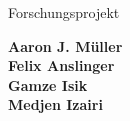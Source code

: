 \begin{titlepage}
\begin{center}

    
    


\vfill
{}
\hfill
{}

\vspace{3cm}

\LARGE{Forschungsprojekt}\\
\Huge{\textbf{\thesisTitle}}



\vspace{1cm} 

\Large{\textbf{Aaron J. Müller}} \\ 
\Large{\textbf{Felix Anslinger}} \\
\Large{\textbf{Gamze Isik}} \\
\Large{\textbf{Medjen Izairi}} \\ [0.3cm]


\end{center}
\end{titlepage}
